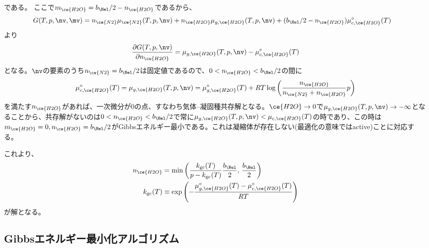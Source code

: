 である。
ここで$m_{\ce{H2O}} = b_\Hel/2 - n_{\ce{H2O}}$であるから、
\begin{align}
    G (T, p, \nv, \mv) &= n_{\ce{N2}} \mu_{\ce{N2}} (T, p, \nv) + n_{\ce{H2O}} \mu_{g,\ce{H2O}} (T, p, \nv) + (b_\Hel/2 - n_{\ce{H2O}}) \mu^\circ_{c, \ce{H2O}} (T)
\end{align}
より
\begin{align}
     \frac{\partial G (T, p, \nv)}{\partial n_{\ce{H2O}}}  = \mu_{g,\ce{H2O}} (T, p, \nv) - \mu^\circ_{c, \ce{H2O}} (T)
\end{align}
となる。$\nv$の要素のうち$n_{\ce{N2}} = b_{\Nel}/2$は固定値であるので、$0 < n_{\ce{H2O}} < b_{\Hel}/2$の間に
\begin{align}
 \mu^\circ_{c, \ce{H2O}} (T) = \mu_{g,\ce{H2O}} (T, p, \nv) = \mu_{g,\ce{H2O}}^\circ(T) + RT \log{\left(\frac{n_{\ce{H2O}}}{n_{\ce{N2}} + n_{\ce{H2O}}}  p \right)} 
\end{align}
を満たす$n_{\ce{H2O}}$があれば、一次微分が0の点、すなわち気体--凝固種共存解となる。${\ce{H2O}} \to 0$で$ \mu_{g,\ce{H2O}} (T, p, \nv) \to - \infty$となることから、共存解がないのは$0 < n_{\ce{H2O}} < b_{\Hel}/2$で常に$\mu_{g,\ce{H2O}} (T, p, \nv) < \mu_{c, \ce{H2O}} (T)$の時であり、この時は$m_{\ce{H2O}}=0, n_{\ce{H2O}}=b_{\Hel}/2$がGibbsエネルギー最小である。これは凝縮体が存在しない(最適化の意味ではactive)ことに対応する。

これより、
\begin{align}
    n_{\ce{H2O}} &= \mathrm{min} \left( \frac{ k_\mathrm{gc}(T)}{p -  k_\mathrm{gc}(T)} \frac{b_{\Nel}}{2} , \,  \frac{b_{\Hel}}{2} \right) \\
     k_\mathrm{gc}(T) &\equiv \exp{\left( - \frac{\mu^\circ_{g, \ce{H2O}} (T) - \mu^\circ_{c, \ce{H2O}} (T) }{R T} \right)}
\end{align}
が解となる。

\subsection{Gibbsエネルギー最小化アルゴリズム}





